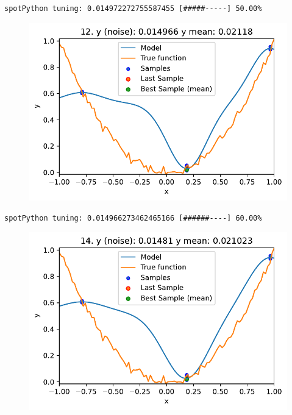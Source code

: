\documentclass[
  letterpaper,
  DIV=11,
  numbers=noendperiod]{scrreprt}
\begin{document}
\begin{verbatim}
spotPython tuning: 0.014972272755587455 [#####-----] 50.00% 
\end{verbatim}

\begin{figure}[H]

{\centering \includegraphics{013_num_spot_noisy_files/figure-pdf/cell-6-output-6.pdf}

}

\end{figure}

\begin{verbatim}
spotPython tuning: 0.014966273462465166 [######----] 60.00% 
\end{verbatim}

\begin{figure}[H]

{\centering \includegraphics{013_num_spot_noisy_files/figure-pdf/cell-6-output-8.pdf}

}

\end{figure}
\end{document}
